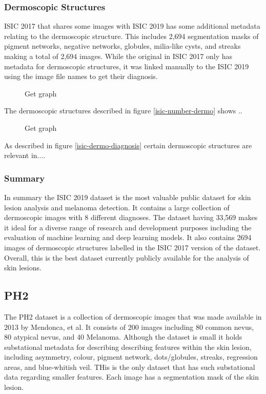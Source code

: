 \subsubsection{Dermoscopic Structures}

ISIC 2017 that shares some images with ISIC 2019 has some additional metadata relating to the dermoscopic structure. This includes 2,694 segmentation masks of pigment networks, negative networks, globules, milia-like cysts, and streaks making a total of 2,694 images. While the original in ISIC 2017 only has metadata for dermoscopic structures, it was linked manually to the ISIC 2019 using the image file names to get their diagnosis.

\begin{figure}
	\centering
	\caption{Get graph} 
\end{figure} \label{isic-number-dermo}

The dermoscopic structures described in figure \ref{isic-number-dermo} shows ..

\begin{figure}
	\centering
	\caption{Get graph} 
\end{figure} \label{isic-dermo-diagnosis}

As described in figure \ref{isic-dermo-diagnosis} certain dermoscopic structures are relevant in....


\subsubsection{Summary}
In summary the ISIC 2019 dataset is the most valuable public dataset for skin lesion analysis and melanoma detection. It contains a large collection of dermoscopic images with 8 different diagnoses. The dataset having 33,569 makes it ideal for a diverse range of research and development purposes including the evaluation of machine learning and deep learning models. It also contains 2694 images of dermoscopic structures labelled in the ISIC 2017 version of the dataset. Overall, this is the best dataset currently publicly available for the analysis of skin lesions.


\subsection{PH2}
The PH2 dataset is a collection of dermoscopic images that was made available in 2013 by Mendonca, et al\cite{}. It consists of 200 images including 80 common nevus, 80 atypical nevus, and 40 Melanoma. Although the dataset is small it holds substational metadata for describing describing features within the skin lesion, including asymmetry, colour, pigment network, dots/globules, streaks, regression areas, and blue-whitish veil. THis is the only dataset that has such substational data regarding smaller features. Each image has a segmentation mask of the skin lesion.

